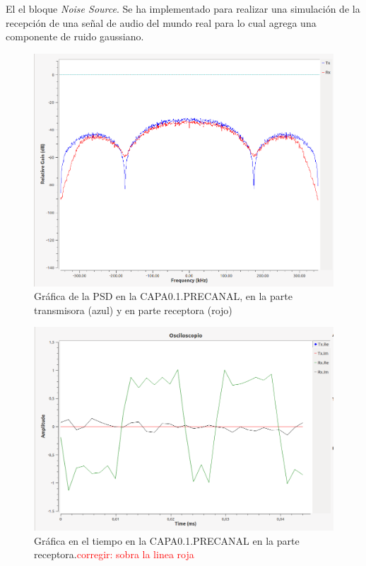 \begin{itemize}
El el bloque  \textit{Noise Source}. Se ha implementado para realizar una simulación de la recepción de una señal de audio del mundo real para lo cual  agrega una componente de ruido gaussiano.

\begin{figure}[h!]
	\captionsetup{justification = raggedright, singlelinecheck = false}
    \caption{Gráfica de la PSD en la CAPA0.1.PRECANAL, en la parte transmisora (azul) y en parte receptora (rojo)}
    \label{fig:ej1_precanal_psd}
    \includegraphics[width=1\linewidth]{Imagenes/capa01.png}
    \centering
\end{figure}

\vspace{200px}
\begin{figure}[h!]
	\captionsetup{justification = raggedright, singlelinecheck = false}
	\caption{Gráfica en el tiempo en la CAPA0.1.PRECANAL en la parte receptora.\textcolor{red}{corregir: sobra la linea roja}}
	\label{fig:ej1_precanal_tiempo}
    \includegraphics[width=1\linewidth]{Imagenes/tiempocapa01.png}
    \centering
\end{figure}


\end{itemize}
